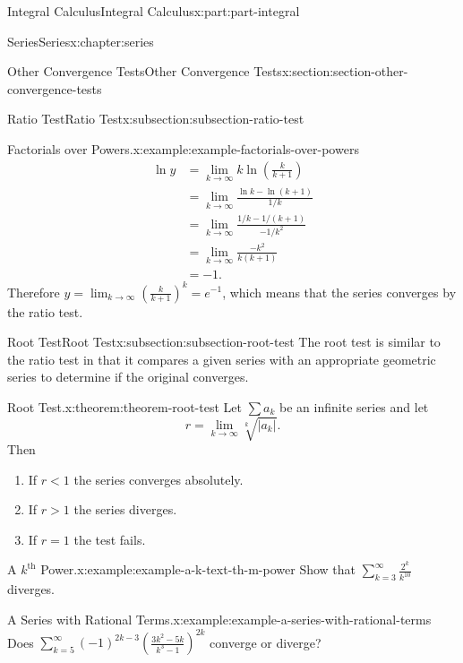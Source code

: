 \documentclass[twoside,10pt,]{tufte-book}
\numberwithin{equation}{part}
\newcommand{\lt}{<}
\newcommand{\gt}{>}
\newcommand{\amp}{&}
\begin{document}
\begin{partptx}{Integral Calculus}{}{Integral Calculus}{}{}{x:part:part-integral}
\begin{chapterptx}{Series}{}{Series}{}{}{x:chapter:series}
\begin{sectionptx}{Other Convergence Tests}{}{Other Convergence Tests}{}{}{x:section:section-other-convergence-tests}
\begin{subsectionptx}{Ratio Test}{}{Ratio Test}{}{}{x:subsection:subsection-ratio-test}
\begin{example}{Factorials over Powers.}{x:example:example-factorials-over-powers}
\begin{align*}
\ln y \amp = \lim_{k\to\infty}k\ln\left(\frac{k}{k+1}\right) \\
\amp = \lim_{k\to\infty}\frac{\ln k - \ln(k+1)}{1/k} \\
\amp = \lim_{k\to\infty}\frac{1/k - 1/(k+1)}{-1/k^{2}} \\
\amp = \lim_{k\to\infty}\frac{-k^{2}}{k(k+1)} \\
\amp = -1 \text{.}
\end{align*}
Therefore \(y = \lim_{k\to\infty}\left(\frac{k}{k+1}\right)^{k} = e^{-1}\), which means that the series converges by the ratio test.%
\end{example}
\end{subsectionptx}
%
%
\typeout{************************************************}
\typeout{************************************************}
%
\begin{subsectionptx}{Root Test}{}{Root Test}{}{}{x:subsection:subsection-root-test}
The root test is similar to the ratio test in that it compares a given series with an appropriate geometric series to determine if the original converges.%
\begin{theorem}{Root Test.}{}{x:theorem:theorem-root-test}%
Let \(\sum a_{k}\) be an infinite series and let%
\begin{equation*}
r = \lim_{k\to\infty}\sqrt[k]{|a_{k}|}\text{.}
\end{equation*}
Then%
\begin{enumerate}
\item{}If \(r \lt 1\) the series converges absolutely.%
\item{}If \(r \gt 1\) the series diverges.%
\item{}If \(r = 1\) the test fails.%
\end{enumerate}
%
\end{theorem}
\begin{example}{A \(k^{\text{th}}\) Power.}{x:example:example-a-k-text-th-m-power}%
Show that \(\sum_{k=3}^{\infty}\frac{2^{k}}{k^{10}}\) diverges.%
\end{example}
\begin{example}{A Series with Rational Terms.}{x:example:example-a-series-with-rational-terms}%
Does \(\sum_{k=5}^{\infty}(-1)^{2k - 3}\left(\frac{3k^{2} - 5k}{k^{3} - 1}\right)^{2k}\) converge or diverge?%
\end{example}
\end{subsectionptx}
\end{sectionptx}
%
%
\typeout{************************************************}

\end{chapterptx}
\end{partptx}
\end{document}
